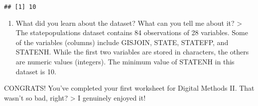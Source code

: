 \documentclass[
]{article}
\providecommand{\tightlist}{%
  \setlength{\itemsep}{0pt}\setlength{\parskip}{0pt}}
\begin{document}
\begin{verbatim}
## [1] 10
\end{verbatim}

\begin{enumerate}
\def\labelenumi{(\arabic{enumi})}
\setcounter{enumi}{26}
\tightlist
\item
  What did you learn about the dataset? What can you tell me about it?
  \textgreater{} The statepopulations dataset contains 84 observations
  of 28 variables. Some of the variables (columns) include GISJOIN,
  STATE, STATEFP, and STATENH. While the first two variables are stored
  in characters, the others are numeric values (integers). The minimum
  value of STATENH in this dataset is 10.
\end{enumerate}

CONGRATS! You've completed your first worksheet for Digital Methods II.
That wasn't so bad, right? \textgreater{} I genuinely enjoyed it!
\end{document}
